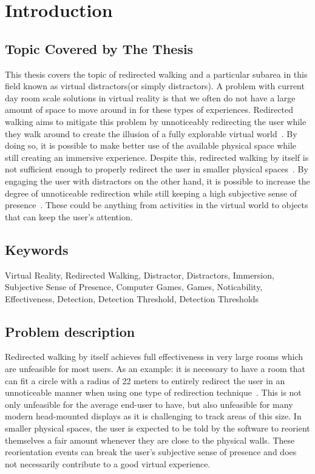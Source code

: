 \chapter{Introduction}
\label{chap:introduction}

\section{Topic Covered by The Thesis}
This thesis covers the topic of redirected walking and a particular subarea in this field known as virtual distractors(or simply distractors). A problem with current day room scale solutions in virtual reality is that we often do not have a large amount of space to move around in for these types of experiences. Redirected walking aims to mitigate this problem by unnoticeably redirecting the user while they walk around to create the illusion of a fully explorable virtual world~\cite{razzaque2001redirected}. By doing so, it is possible to make better use of the available physical space while still creating an immersive experience. Despite this, redirected walking by itself is not sufficient enough to properly redirect the user in smaller physical spaces~\cite{5072212,azmandian2015physical}. By engaging the user with distractors on the other hand, it is possible to increase the degree of unnoticeable redirection while still keeping a high subjective sense of presence~\cite{peck2009evaluation}. These could be anything from activities in the virtual world to objects that can keep the user's attention.  


\section{Keywords}
Virtual Reality, Redirected Walking, Distractor, Distractors, Immersion, Subjective Sense of Presence, Computer Games, Games, Noticability, Effectiveness, Detection, Detection Threshold, Detection Thresholds

\section{Problem description}
Redirected walking by itself achieves full effectiveness in very large rooms which are unfeasible for most users. As an example: it is necessary to have a room that can fit a circle with a radius of 22 meters to entirely redirect the user in an unnoticeable manner when using one type of redirection technique~\cite{5072212, azmandian2015physical}. This is not only unfeasible for the average end-user to have, but also unfeasible for many modern head-mounted displays as it is challenging to track areas of this size. In smaller physical spaces, the user is expected to be told by the software to reorient themselves a fair amount whenever they are close to the physical walls. These reorientation events can break the user's subjective sense of presence and does not necessarily contribute to a good virtual experience. 

